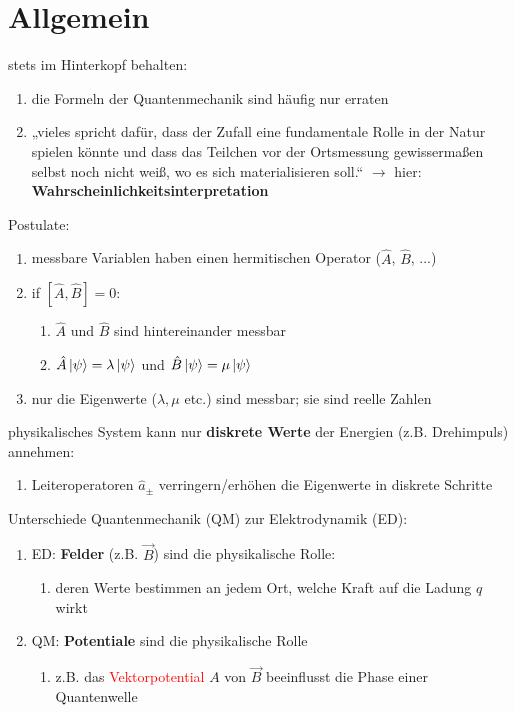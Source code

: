 \pagestyle{headings}

\section{Allgemein}

stets im Hinterkopf behalten:
\begin{enumerate}
\item die Formeln der Quantenmechanik sind häufig nur erraten
\item „vieles spricht dafür, dass der Zufall eine fundamentale Rolle in der Natur spielen könnte und dass 
das Teilchen vor der Ortsmessung gewissermaßen selbst noch nicht weiß, wo es sich materialisieren soll.“ $\rightarrow$ hier: \textbf{Wahrscheinlichkeitsinterpretation}
\end{enumerate}

Postulate:
\begin{enumerate}
\item messbare Variablen haben einen hermitischen Operator ($\hat{A}$, $\hat{B}$, ...) 
\item if $[\hat{A},\hat{B}]=0$:
\begin{enumerate}
    \item $\hat{A}$ und $\hat{B}$ sind hintereinander messbar
    \item $\hat{A}\ket{\psi}=\lambda\ket{\psi}$ und $\hat{B}\ket{\psi}=\mu\ket{\psi}$
\end{enumerate}
\item nur die Eigenwerte ($\lambda,\mu$ etc.) sind messbar; sie sind reelle Zahlen 

\end{enumerate}

physikalisches System kann nur \textbf{diskrete Werte} der Energien (z.B. Drehimpuls) annehmen:
\begin{enumerate}
    \item Leiteroperatoren $\hat{a}_\pm$ verringern/erhöhen die Eigenwerte in diskrete Schritte 
\end{enumerate}

Unterschiede Quantenmechanik (QM) zur Elektrodynamik (ED):
\begin{enumerate}
    \item ED: \textbf{Felder} (z.B. $\vec{B}$) sind die physikalische Rolle:
    \begin{enumerate}
        \item deren Werte bestimmen an jedem Ort, welche Kraft auf die Ladung $q$ wirkt

    \end{enumerate}
    \item QM: \textbf{Potentiale} sind die physikalische Rolle
\begin{enumerate}
    \item z.B. das \textcolor{red}{Vektorpotential} $A$ von $\vec{B}$ beeinflusst die Phase einer Quantenwelle 
\end{enumerate}
\end{enumerate}

\newpage